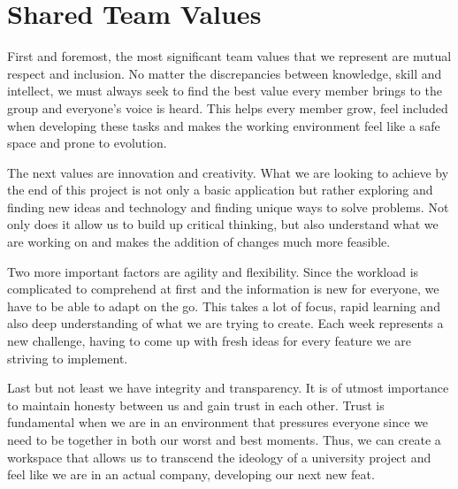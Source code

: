 \section{Shared Team Values}
First and foremost, the most significant team values that we represent are mutual respect and inclusion. No matter the discrepancies between knowledge, skill and intellect, we must always seek to find the best value every member brings to the group and everyone's voice is heard. This helps every member grow, feel included when developing these tasks and makes the working environment feel like a safe space and prone to evolution.\par
\smallskip
The next values are innovation and creativity. What we are looking to achieve by the end of this project is not only a basic application but rather exploring and finding new ideas and technology and finding unique ways to solve problems. Not only does it allow us to build up critical thinking, but also understand what we are working on and makes the addition of changes much more feasible.\par
\smallskip
Two more important factors are agility and flexibility. Since the workload is complicated to comprehend at first and the information is new for everyone, we have to be able to adapt on the go. This takes a lot of focus, rapid learning and also deep understanding of what we are trying to create. Each week represents a new challenge, having to come up with fresh ideas for every feature we are striving to implement.\par
\smallskip
Last but not least we have integrity and transparency. It is of utmost importance to maintain honesty between us and gain trust in each other. Trust is fundamental when we are in an environment that pressures everyone since we need to be together in both our worst and best moments. Thus, we can create a workspace that allows us to transcend the ideology of a university project and feel like we are in an actual company, developing our next new feat.\par



